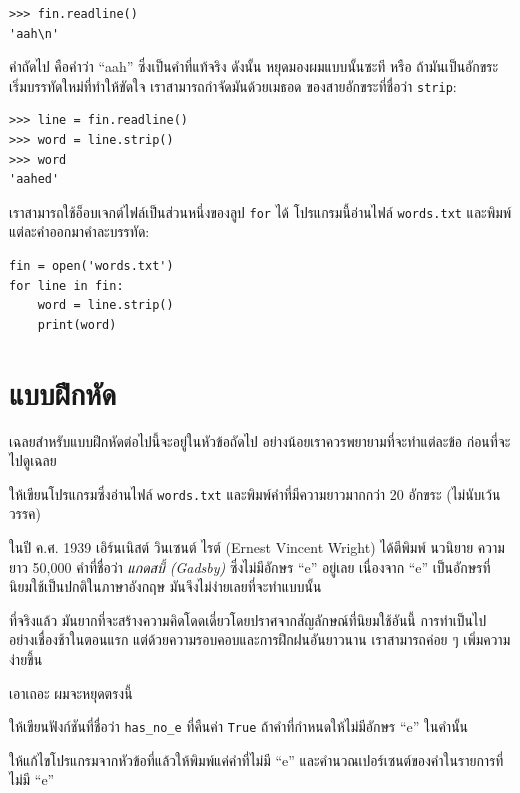 \begin{verbatim}
>>> fin.readline()
'aah\n'
\end{verbatim}
% 
คำถัดไป คือคำว่า ``aah'' ซึ่งเป็นคำที่แท้จริง ดังนั้น หยุดมองผมแบบนั้นซะที
หรือ ถ้ามันเป็นอักขระเริ่มบรรทัดใหม่ที่ทำให้ขัดใจ เราสามารถกำจัดมันด้วยเมธอด
ของสายอักขระที่ชื่อว่า {\tt strip}:

\begin{verbatim}
>>> line = fin.readline()
>>> word = line.strip()
>>> word
'aahed'
\end{verbatim}
%
เราสามารถใช้อ็อบเจกต์ไฟล์เป็นส่วนหนึ่งของลูป {\tt for} ได้ โปรแกรมนี้อ่านไฟล์ {\tt words.txt}
และพิมพ์แต่ละคำออกมาคำละบรรทัด:

\begin{verbatim}
fin = open('words.txt')
for line in fin:
    word = line.strip()
    print(word)
\end{verbatim}
%

\section{แบบฝึกหัด}

เฉลยสำหรับแบบฝึกหัดต่อไปนี้จะอยู่ในหัวข้อถัดไป อย่างน้อยเราควรพยายามที่จะทำแต่ละข้อ
ก่อนที่จะไปดูเฉลย

\begin{exercise}
ให้เขียนโปรแกรมซึ่งอ่านไฟล์ {\tt words.txt} และพิมพ์คำที่มีความยาวมากกว่า
20 อักขระ (ไม่นับเว้นวรรค)

\end{exercise}

\begin{exercise}

ในปี ค.ศ. 1939 เอิร์นเนิสต์ วินเซนต์ ไรต์ (Ernest Vincent Wright) ได้ตีพิมพ์ นวนิยาย
ความยาว 50,000 คำที่ชื่อว่า {\em แกดสบี้ (Gadsby)} ซึ่งไม่มีอักษร ``e'' อยู่เลย
เนื่องจาก ``e'' เป็นอักษรที่นิยมใช้เป็นปกติในภาษาอังกฤษ มันจึงไม่ง่ายเลยที่จะทำแบบนั้น

ที่จริงแล้ว มันยากที่จะสร้างความคิดโดดเดี่ยวโดยปราศจากสัญลักษณ์ที่นิยมใช้อันนี้ การทำเป็นไป
อย่างเชื่องช้าในตอนแรก แต่ด้วยความรอบคอบและการฝึกฝนอันยาวนาน เราสามารถค่อย ๆ เพิ่มความง่ายขึ้น

เอาเถอะ ผมจะหยุดตรงนี้

ให้เขียนฟังก์ชันที่ชื่อว่า \verb"has_no_e" ที่คืนค่า {\tt True} ถ้าคำที่กำหนดให้ไม่มีอักษร
``e'' ในคำนั้น

ให้แก้ไขโปรแกรมจากหัวข้อที่แล้วให้พิมพ์แค่คำที่ไม่มี ``e'' และคำนวณเปอร์เซนต์ของคำในรายการที่ไม่มี ``e''

\end{exercise}


